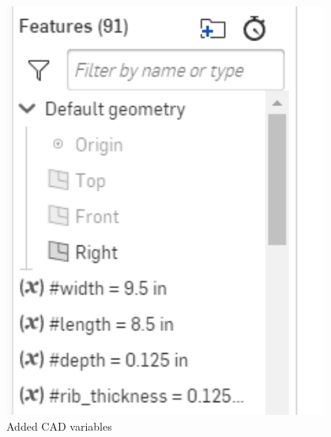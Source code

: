 \begin{figure}[ht]
\begin{minipage}[b]{.48\textwidth}
  \includegraphics[width=0.95\textwidth]{Meetings/October/10-18-21/10-18-21_CAD_Figure2 - Nathan Forrer.PNG}
  \caption{Added CAD variables}
  \label{fig:101821_2}
\end{minipage}
\end{figure}


